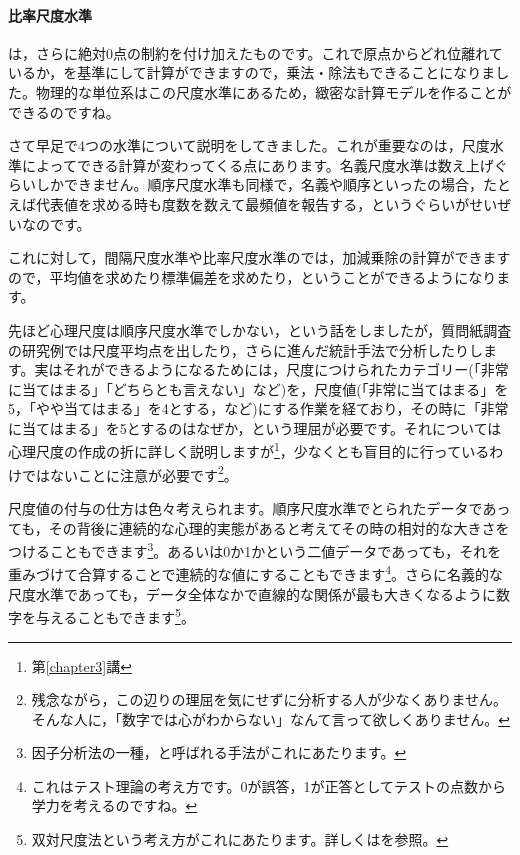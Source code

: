 \documentclass{ltjsbook}
\begin{document}
\paragraph{比率尺度水準}  は，さらに絶対0点の制約を付け加えたものです。これで原点からどれ位離れているか，を基準にして計算ができますので，乗法・除法もできることになりました。物理的な単位系はこの尺度水準にあるため，緻密な計算モデルを作ることができるのですね。

さて早足で4つの水準について説明をしてきました。これが重要なのは，尺度水準によってできる計算が変わってくる点にあります。名義尺度水準は数え上げぐらいしかできません。順序尺度水準も同様で，名義や順序といったの場合，たとえば代表値を求める時も度数を数えて最頻値を報告する，というぐらいがせいぜいなのです。

これに対して，間隔尺度水準や比率尺度水準のでは，加減乗除の計算ができますので，平均値を求めたり標準偏差を求めたり，ということができるようになります。

先ほど心理尺度は順序尺度水準でしかない，という話をしましたが，質問紙調査の研究例では尺度平均点を出したり，さらに進んだ統計手法で分析したりします。実はそれができるようになるためには，尺度につけられたカテゴリー(「非常に当てはまる」「どちらとも言えない」など)を，尺度値(「非常に当てはまる」を5，「やや当てはまる」を4とする，など)にする作業を経ており，その時に「非常に当てはまる」を5とするのはなぜか，という理屈が必要です。それについては心理尺度の作成の折に詳しく説明しますが\footnote{第\ref{chapter3}講}，少なくとも盲目的に行っているわけではないことに注意が必要です\footnote{残念ながら，この辺りの理屈を気にせずに分析する人が少なくありません。そんな人に，「数字では心がわからない」なんて言って欲しくありません。}。

尺度値の付与の仕方は色々考えられます。順序尺度水準でとられたデータであっても，その背後に連続的な心理的実態があると考えてその時の相対的な大きさをつけることもできます\footnote{因子分析法の一種，と呼ばれる手法がこれにあたります。}。あるいは0か1かという二値データであっても，それを重みづけて合算することで連続的な値にすることもできます\footnote{これはテスト理論の考え方です。0が誤答，1が正答としてテストの点数から学力を考えるのですね。}。さらに名義的な尺度水準であっても，データ全体なかで直線的な関係が最も大きくなるように数字を与えることもできます\footnote{双対尺度法という考え方がこれにあたります。詳しくは\citet{西里静彦2010}を参照。}。
\end{document}
